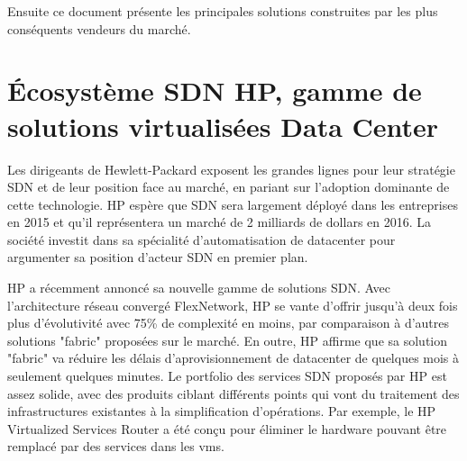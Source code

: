 Ensuite ce document présente les principales solutions construites par les plus conséquents vendeurs du marché.



\section{Écosystème SDN HP, gamme de solutions virtualisées Data Center}


Les dirigeants de Hewlett-Packard exposent les grandes lignes pour leur stratégie SDN et de leur position face au marché, en pariant sur l'adoption dominante de cette technologie. HP espère que SDN sera largement déployé dans les entreprises en 2015 et qu'il représentera un marché de 2 milliards de dollars en 2016. La société investit dans sa spécialité d'automatisation de \gls{datacenter} pour argumenter sa position d'acteur SDN en premier plan. \cite{ExecutiveGuideToSDNHP}


HP a récemment annoncé sa nouvelle gamme de solutions SDN. Avec l'architecture réseau convergé FlexNetwork, HP se vante d'offrir jusqu'à deux fois plus d'évolutivité avec 75\% de complexité en moins, par comparaison à d'autres solutions "fabric" proposées sur le marché. En outre, HP affirme que sa solution "fabric" va réduire les délais d'aprovisionnement de \gls{datacenter} de quelques mois à seulement quelques minutes. Le portfolio des services SDN proposés par HP est assez solide, avec des produits ciblant différents points qui vont du traitement des infrastructures existantes à la simplification d'opérations. Par exemple, le HP Virtualized Services Router a été conçu pour éliminer le hardware pouvant être remplacé par des services dans les \glspl{vm}.  



